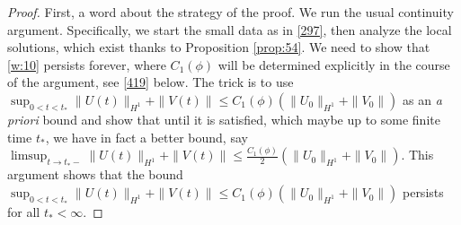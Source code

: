 \documentclass[12pt]{amsart}
\theoremstyle{definition}
\theoremstyle{remark}
\numberwithin{equation}{section}
\renewcommand{\(}{\left(}
\renewcommand{\)}{\right)}
\renewcommand{\[}{\left[}
\renewcommand{\]}{\right]}
\newcommand{\f}[2]{\frac{#1}{#2}}
\begin{document}
\begin{proof} 
	First, a word about the strategy of the proof. We run the usual continuity argument. Specifically,  we start the small data as in \eqref{297}, then analyze the local solutions, which exist thanks to  Proposition \ref{prop:54}. We need to show that \eqref{w:10} persists forever, where $C_1(\phi)$ will be determined explicitly in the course of the argument, see \eqref{419} below.  The trick is to use \\  $\sup_{0<t<t_*}	\|U(t)\|_{H^1}+ \|V(t)\|\leq C_1(\phi)  (\|U_0\|_{H^1}+\|V_0\|)$ as an {\it a priori} bound and show that until it is satisfied, which maybe up to some finite time  $t_*$, we have in fact a better bound, say $\limsup_{t\to t_*-} \|U(t)\|_{H^1}+ \|V(t)\|\leq \f{C_1(\phi)}{2} (\|U_0\|_{H^1}+\|V_0\|)$. This argument shows that the bound $\sup_{0<t<t_*}	\|U(t)\|_{H^1}+ \|V(t)\|\leq C_1(\phi)  (\|U_0\|_{H^1}+\|V_0\|)$ persists for all $t_*<\infty$. 
	

\end{proof}
\end{document}
